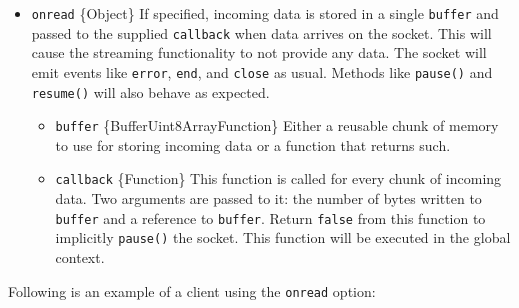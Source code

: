 \begin{itemize}
\tightlist
\item
  \texttt{onread} \{Object\} If specified, incoming data is stored in a
  single \texttt{buffer} and passed to the supplied \texttt{callback}
  when data arrives on the socket. This will cause the streaming
  functionality to not provide any data. The socket will emit events
  like \texttt{\textquotesingle{}error\textquotesingle{}},
  \texttt{\textquotesingle{}end\textquotesingle{}}, and
  \texttt{\textquotesingle{}close\textquotesingle{}} as usual. Methods
  like \texttt{pause()} and \texttt{resume()} will also behave as
  expected.

  \begin{itemize}
  \tightlist
  \item
    \texttt{buffer} \{Buffer\textbar Uint8Array\textbar Function\}
    Either a reusable chunk of memory to use for storing incoming data
    or a function that returns such.
  \item
    \texttt{callback} \{Function\} This function is called for every
    chunk of incoming data. Two arguments are passed to it: the number
    of bytes written to \texttt{buffer} and a reference to
    \texttt{buffer}. Return \texttt{false} from this function to
    implicitly \texttt{pause()} the socket. This function will be
    executed in the global context.
  \end{itemize}
\end{itemize}

Following is an example of a client using the \texttt{onread} option:

\begin{Shaded}
\begin{Highlighting}[]
\OperatorTok{=} \NormalTok{(}\NormalTok{)}\OperatorTok{;}
\NormalTok{(\{}
  \OperatorTok{:} \OperatorTok{,}
  \OperatorTok{:}\NormalTok{ \{}
    \OperatorTok{:} \NormalTok{(} \OperatorTok{*} \NormalTok{)}\OperatorTok{,}
    \OperatorTok{:} \OperatorTok{,}
      \NormalTok{(}\OperatorTok{,} \OperatorTok{,}\OperatorTok{;}
\NormalTok{    \}}\OperatorTok{,}
\NormalTok{  \}}\OperatorTok{,}
\NormalTok{\})}\OperatorTok{;}
\end{Highlighting}
\end{Shaded}

